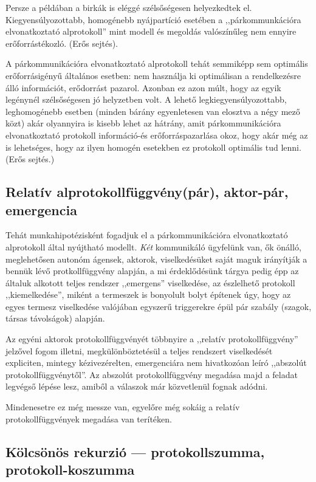 \documentclass{article}
\begin{document}
	Persze a példában a birkák is eléggé szélsőségesen helyezkedtek el. Kiegyensúlyozottabb, homogénebb nyájpartíció esetében a ,,párkommunkációra elvonatkoztató alprotokoll'' mint modell és megoldás valószínűleg nem ennyire erőforrástékozló. (Erős sejtés).

	A párkommunikációra elvonatkoztató alprotokoll tehát semmiképp sem optimális erőforrásigényű általános esetben: nem használja ki optimálisan a rendelkezésre álló információt, erődorrást pazarol. Azonban ez azon múlt, hogy az egyik legénynél szélsőségesen jó helyzetben volt. A lehető legkiegyensúlyozottabb, leghomogénebb esetben (minden bárány egyenletesen van elosztva a négy mező közt) akár olyannyira is kisebb lehet az  hátrány, amit párkommunikációra elvonatkoztató protokoll információ-és erőforráspazarlása okoz, hogy akár még az is lehetséges, hogy az ilyen homogén esetekben ez  protokoll optimális tud lenni. (Erős sejtés.)

	\subsection{Relatív alprotokollfüggvény(pár), aktor-pár, emergencia}

	Tehát munkahipotézisként fogadjuk el a párkommunikációra elvonatkoztató alprotokoll által nyújtható modellt. \emph{Két} kommunikáló ügyfelünk van, ők önálló, meglehetősen autonóm ágensek, aktorok, viselkedésüket saját maguk irányítják a bennük lévő protkollfüggvény alapján, a mi érdeklődésünk tárgya pedig épp az általuk alkotott teljes rendszer ,,emergens'' viselkedése, az észlelhető protokoll ,,kiemelkedése'', miként a termeszek is bonyolult bolyt építenek úgy, hogy az egyes termesz viselkedése valójában egyszerű triggerekre épül pár szabály (szagok, társas távolságok) alapján.

	Az egyéni aktorok protokollfüggvényét többnyire a ,,relatív protokollfüggvény'' jelzővel fogom illetni, megkülönböztetésül a teljes rendszert viselkedését expliciten, mintegy kézivezérelten, emergenciára nem hivatkozóan leíró ,,abszolút protokollfüggvénytől''. Az abszolút protokollfüggvény megadása majd a feladat legvégső lépése lesz, amiből a válaszok már közvetlenül fognak adódni.

	Mindenesetre ez még messze van, egyelőre még sokáig a relatív protokollfüggvények megadása van terítéken.

	\subsection{Kölcsönös rekurzió --- protokollszumma, protokoll-koszumma}
\end{document}
